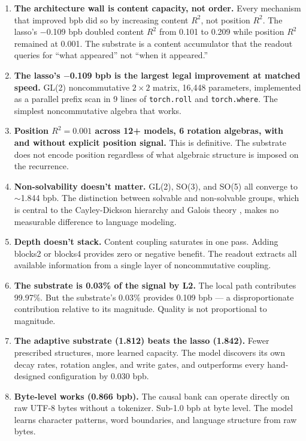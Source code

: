 \documentclass[11pt,a4paper]{report}
\begin{document}
\begin{enumerate}
\item \textbf{The architecture wall is content capacity, not order.} Every mechanism that improved bpb did so by increasing content $R^2$, not position $R^2$. The lasso's $-$0.109 bpb doubled content $R^2$ from 0.101 to 0.209 while position $R^2$ remained at 0.001. The substrate is a content accumulator that the readout queries for ``what appeared'' not ``when it appeared.''

\item \textbf{The lasso's $-$0.109 bpb is the largest legal improvement at matched speed.} GL(2) noncommutative $2 \times 2$ matrix, 16,448 parameters, implemented as a parallel prefix scan in 9 lines of \texttt{torch.roll} and \texttt{torch.where}. The simplest noncommutative algebra that works.

\item \textbf{Position $R^2 = 0.001$ across 12+ models, 6 rotation algebras, with and without explicit position signal.} This is definitive. The substrate does not encode position regardless of what algebraic structure is imposed on the recurrence.

\item \textbf{Non-solvability doesn't matter.} GL(2), SO(3), and SO(5) all converge to $\sim$1.844 bpb. The distinction between solvable and non-solvable groups, which is central to the Cayley-Dickson hierarchy and Galois theory \cite{abel, cayley}, makes no measurable difference to language modeling.

\item \textbf{Depth doesn't stack.} Content coupling saturates in one pass. Adding blocks2 or blocks4 provides zero or negative benefit. The readout extracts all available information from a single layer of noncommutative coupling.

\item \textbf{The substrate is 0.03\% of the signal by L2.} The local path contributes 99.97\%. But the substrate's 0.03\% provides 0.109 bpb --- a disproportionate contribution relative to its magnitude. Quality is not proportional to magnitude.

\item \textbf{The adaptive substrate (1.812) beats the lasso (1.842).} Fewer prescribed structures, more learned capacity. The model discovers its own decay rates, rotation angles, and write gates, and outperforms every hand-designed configuration by 0.030 bpb.

\item \textbf{Byte-level works (0.866 bpb).} The causal bank can operate directly on raw UTF-8 bytes without a tokenizer. Sub-1.0 bpb at byte level. The model learns character patterns, word boundaries, and language structure from raw bytes.
\end{enumerate}
\end{document}
